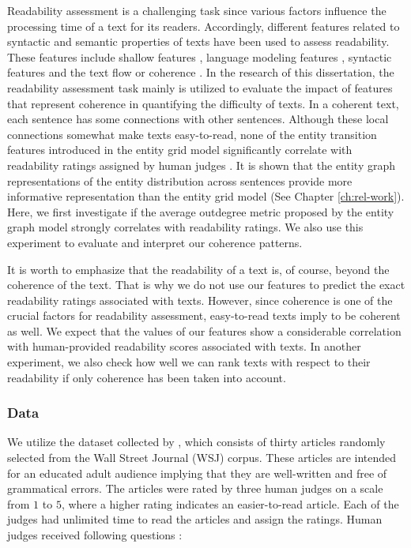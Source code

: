 Readability assessment is a challenging task since various factors influence the processing time of a text for its readers.
Accordingly, different features related to syntactic and semantic properties of texts have been used to assess readability. 
These features include shallow features \cite{flesch48,kincaid75}, language modeling features \cite{siluo01,collins-thompson04}, syntactic features \cite{schwarm05} and the text flow or coherence \cite{barzilay08,pitler08}. 
In the research of this dissertation, the readability assessment task mainly is utilized to evaluate the impact of features that represent coherence in quantifying the difficulty of texts.  
In a coherent text, each sentence has some connections with other sentences. 
Although these local connections somewhat make texts easy-to-read, none of the entity transition features introduced in the entity grid model \cite{barzilay08} significantly correlate with readability ratings assigned by human judges \cite{pitler08}.  
It is shown that the entity graph representations of the entity distribution across sentences provide more informative representation than the entity grid model (See Chapter \ref{ch:rel-work}).  
Here, we first investigate if the average outdegree metric proposed by the entity graph model strongly correlates with readability ratings. 
We also use this experiment to evaluate and interpret our coherence patterns. 

It is worth to emphasize that the readability of a text is, of course, beyond the coherence of the text. 
That is why we do not use our features to predict the exact readability ratings associated with texts. 
However, since coherence is one of the crucial factors for readability assessment, easy-to-read texts imply to be coherent as well. 
We expect that the values of our features show a considerable correlation with human-provided readability scores associated with texts. 
In another experiment, we also check how well we can rank texts with respect to their readability if only coherence has been taken into account. 


\subsubsection{Data}
\label{sec:data_pitler}

We utilize the dataset collected by , which consists of thirty articles randomly selected from the Wall Street Journal (WSJ) corpus. 
These articles are intended for an educated adult audience implying that they are well-written and free of grammatical errors. 
The articles were rated by three human judges on a scale from $1$ to $5$, where a higher rating indicates an easier-to-read article. 
Each of the judges had unlimited time to read the articles and assign the ratings. 
Human judges received following questions \cite{pitler08}:

